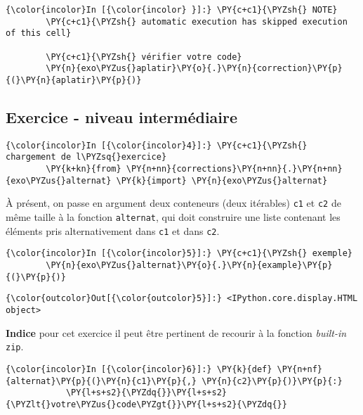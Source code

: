     \begin{Verbatim}[commandchars=\\\{\}]
{\color{incolor}In [{\color{incolor} }]:} \PY{c+c1}{\PYZsh{} NOTE}
        \PY{c+c1}{\PYZsh{} automatic execution has skipped execution of this cell}
        
        \PY{c+c1}{\PYZsh{} vérifier votre code}
        \PY{n}{exo\PYZus{}aplatir}\PY{o}{.}\PY{n}{correction}\PY{p}{(}\PY{n}{aplatir}\PY{p}{)}
\end{Verbatim}


    \hypertarget{exercice---niveau-intermuxe9diaire}{%
\subsection{Exercice - niveau
intermédiaire}\label{exercice---niveau-intermuxe9diaire}}

    \begin{Verbatim}[commandchars=\\\{\}]
{\color{incolor}In [{\color{incolor}4}]:} \PY{c+c1}{\PYZsh{} chargement de l\PYZsq{}exercice}
        \PY{k+kn}{from} \PY{n+nn}{corrections}\PY{n+nn}{.}\PY{n+nn}{exo\PYZus{}alternat} \PY{k}{import} \PY{n}{exo\PYZus{}alternat}
\end{Verbatim}


    À présent, on passe en argument deux conteneurs (deux itérables)
\texttt{c1} et \texttt{c2} de même taille à la fonction
\texttt{alternat}, qui doit construire une liste contenant les éléments
pris alternativement dans \texttt{c1} et dans \texttt{c2}.

    \begin{Verbatim}[commandchars=\\\{\}]
{\color{incolor}In [{\color{incolor}5}]:} \PY{c+c1}{\PYZsh{} exemple}
        \PY{n}{exo\PYZus{}alternat}\PY{o}{.}\PY{n}{example}\PY{p}{(}\PY{p}{)}
\end{Verbatim}


\begin{Verbatim}[commandchars=\\\{\}]
{\color{outcolor}Out[{\color{outcolor}5}]:} <IPython.core.display.HTML object>
\end{Verbatim}
            
    \textbf{Indice} pour cet exercice il peut être pertinent de recourir à
la fonction \emph{built-in} \texttt{zip}.

    \begin{Verbatim}[commandchars=\\\{\}]
{\color{incolor}In [{\color{incolor}6}]:} \PY{k}{def} \PY{n+nf}{alternat}\PY{p}{(}\PY{n}{c1}\PY{p}{,} \PY{n}{c2}\PY{p}{)}\PY{p}{:}
            \PY{l+s+s2}{\PYZdq{}}\PY{l+s+s2}{\PYZlt{}votre\PYZus{}code\PYZgt{}}\PY{l+s+s2}{\PYZdq{}}
\end{Verbatim}


